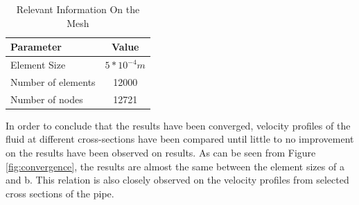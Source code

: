 \begin{table}[h]
\caption{Relevant Information On the Mesh}

\centering
\begin{tabular}{l|c}
\hline
\hline
Parameter          & Value                      \\ \hline
Element Size       & $5*10^{-4}m$ \\
Number of elements & 12000                      \\
Number of nodes    & 12721   

\end{tabular}

\label{table:mesh_info}
\end{table}


\begin{figure}[h]
\end{figure}


\noindent In order to conclude that the results have been converged, velocity profiles of the fluid at different cross-sections have been compared until little to no improvement on the results have been observed on results. As can be seen from Figure \ref{fig:convergence}, the results are almost the same between the element sizes of a and b. This relation is also closely observed on the velocity profiles from selected cross sections of the pipe.\\

\begin{figure}[H]

\end{figure}

